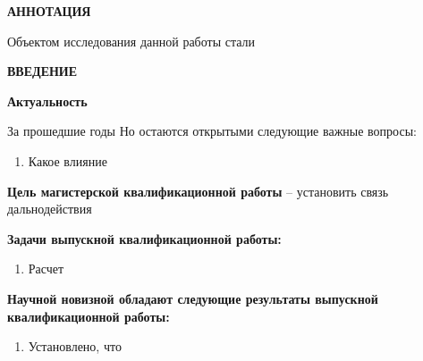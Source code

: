 \newpage
\begin{center}
  \textbf{\large АННОТАЦИЯ}
\end{center}

Объектом исследования данной работы стали

\onehalfspacing
\setcounter{page}{2}

\newpage
\renewcommand{\contentsname}{\centerline{\large СОДЕРЖАНИЕ}}
\tableofcontents

\newpage
\begin{center}
  \textbf{\large ВВЕДЕНИЕ}
\end{center}


\textbf{Актуальность}

За прошедшие годы
Но остаются открытыми следующие важные вопросы:
\begin{enumerate}
\item Какое влияние
\end{enumerate}

\newpage

\textbf{Цель магистерской квалификационной работы} -- установить связь \\ дальнодействия

\textbf{Задачи выпускной квалификационной работы:}
\begin{enumerate}
\item Расчет
\end{enumerate}


\textbf{Научной новизной обладают следующие результаты выпускной
  квалификационной работы:}
\begin{enumerate}
\item Установлено, что
\end{enumerate}
